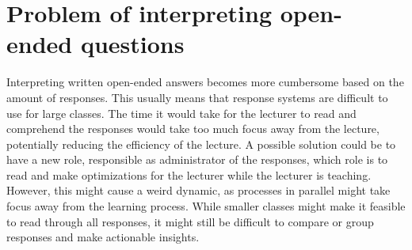 \section{Problem of interpreting open-ended questions}
Interpreting written open-ended answers becomes more cumbersome based on the amount of responses. This usually means that response systems are difficult to use for large classes.  The time it would take for the lecturer to read and comprehend the responses would take too much focus away from the lecture, potentially reducing the efficiency of the lecture. A possible solution could be to have a new role, responsible as administrator of the responses, which role is to read and make optimizations for the lecturer while the lecturer is teaching. However, this might cause a weird dynamic, as processes in parallel might take focus away from the learning process. While smaller classes might make it feasible to read through all responses, it might still be difficult to compare or group responses and make actionable insights. 

